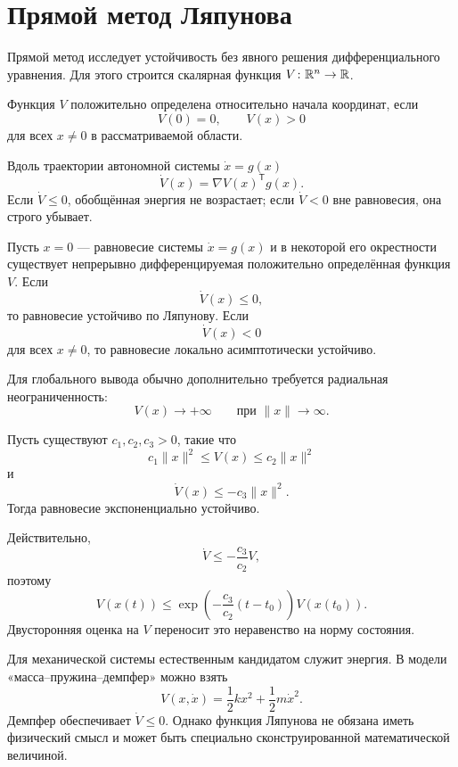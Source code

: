 \section{Прямой метод Ляпунова}

Прямой метод исследует устойчивость без явного решения
дифференциального уравнения. Для этого строится скалярная функция
\(V\colon\mathbb{R}^n\to\mathbb{R}\).

\begin{definition}
Функция \(V\) положительно определена относительно начала координат,
если
\[
    V(0)=0,
    \qquad
    V(x)>0
\]
для всех \(x\ne0\) в рассматриваемой области.
\end{definition}

Вдоль траектории автономной системы \(\dot x=g(x)\)
\[
    \dot V(x)
    =
    \nabla V(x)^{\mathsf T}g(x).
\]
Если \(\dot V\le0\), обобщённая энергия не возрастает; если
\(\dot V<0\) вне равновесия, она строго убывает.

\begin{theorem}
Пусть \(x=0\) --- равновесие системы \(\dot x=g(x)\) и в некоторой
его окрестности существует непрерывно дифференцируемая положительно
определённая функция \(V\). Если
\[
    \dot V(x)\le0,
\]
то равновесие устойчиво по Ляпунову. Если
\[
    \dot V(x)<0
\]
для всех \(x\ne0\), то равновесие локально асимптотически устойчиво.
\end{theorem}

Для глобального вывода обычно дополнительно требуется радиальная
неограниченность:
\[
    V(x)\to+\infty
    \qquad
    \text{при }
    \lVert x\rVert\to\infty.
\]

\begin{theorem}
Пусть существуют \(c_1,c_2,c_3>0\), такие что
\[
    c_1\lVert x\rVert^2
    \le
    V(x)
    \le
    c_2\lVert x\rVert^2
\]
и
\[
    \dot V(x)
    \le
    -c_3\lVert x\rVert^2.
\]
Тогда равновесие экспоненциально устойчиво.
\end{theorem}

Действительно,
\[
    \dot V
    \le
    -\frac{c_3}{c_2}V,
\]
поэтому
\[
    V(x(t))
    \le
    \exp\left(
        -\frac{c_3}{c_2}(t-t_0)
    \right)
    V(x(t_0)).
\]
Двусторонняя оценка на \(V\) переносит это неравенство на норму
состояния. 

Для механической системы естественным кандидатом служит энергия. В
модели «масса--пружина--демпфер» можно взять
\[
    V(x,\dot x)
    =
    \frac12kx^2+
    \frac12m\dot x^2.
\]
Демпфер обеспечивает \(\dot V\le0\). Однако функция Ляпунова не
обязана иметь физический смысл и может быть специально
сконструированной математической величиной.

